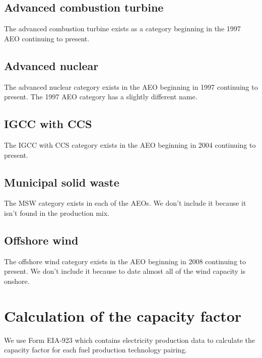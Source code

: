 \documentclass[10pt]{report}
\begin{document}
\subsection{Advanced combustion turbine}
The advanced combustion turbine exists as a category beginning in the 1997 AEO continuing to present. 

\subsection{Advanced nuclear}
The advanced nuclear category exists in the AEO beginning in 1997 continuing to present. 
The 1997 AEO category has a slightly different name. 

\subsection{IGCC with CCS}
The IGCC with CCS category exists in the AEO beginning in 2004 continuing to present. 

\subsection{Municipal solid waste}
The MSW category exists in each of the AEOs. 
We don't include it because it isn't found in the production mix. 

\subsection{Offshore wind}
The offshore wind category exists in the AEO beginning in 2008 continuing to present.  
We don't include it because to date almost all of the wind capacity is onshore.

\section{Calculation of the capacity factor}
We use Form EIA-923 which contains electricity production data to calculate the capacity factor for each fuel production technology pairing. 
\end{document}
